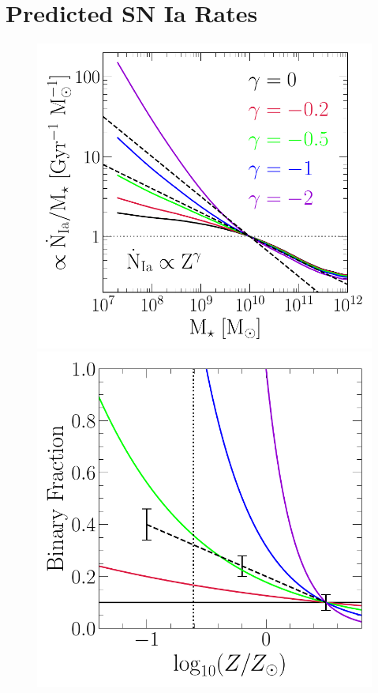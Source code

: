 \documentclass[ms.tex]{subfiles}
\begin{document}
\section{Predicted SN Ia Rates}
\label{sec:predictions}

\begin{figure}
\centering
\includegraphics[scale = 0.60]{umachine_iarate_metdep.pdf}
\includegraphics[scale = 0.61]{binaries_zscaling.pdf}

\end{figure}
\end{document}
